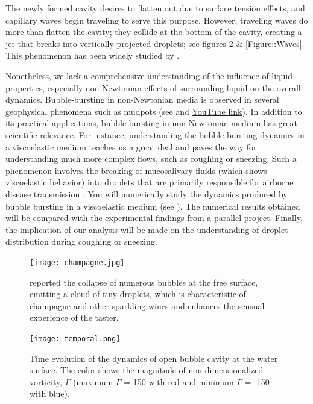 \documentclass[11pt]{article}
\begin{document}
The newly formed cavity desires to flatten out due to surface tension effects, and capillary waves begin traveling to serve this purpose. However, traveling waves do more than flatten the cavity; they collide at the bottom of the cavity, creating a jet that breaks into vertically projected droplets; see figures \ref{Figure::Typical} \& \ref{Figure::Waves}. This phenomenon has been widely studied by \citet{duchemin2002jet, walls2015jet, deike2018dynamics, gordillo2019capillary}.

Nonetheless, we lack a comprehensive understanding of the influence of liquid properties, especially non-Newtonian effects of surrounding liquid on the overall dynamics. Bubble-bursting in non-Newtonian media is observed in several geophysical phenomena such as mudpots (see \citet{sanjay_lohse_jalaal_2021,dixit2024viscoelastic} and \href{https://www.youtube.com/watch?v=a9hUsVq9q7U}{YouTube link}). In addition to its practical applications, bubble-bursting in non-Newtonian medium has great scientific relevance. For instance, understanding the bubble-bursting dynamics in a viscoelastic medium teaches us a great deal and paves the way for understanding much more complex flows, such as coughing or sneezing. Such a phenomenon involves the breaking of mucosalivary fluids (which shows viscoelastic behavior) into droplets that are primarily responsible for airborne disease transmission \citep{walls2017quantifying, bourouiba2021fluid}. You will numerically study the dynamics produced by bubble bursting in a viscoelastic medium (see \citet{dixit2024viscoelastic}). The numerical results obtained will be compared with the experimental findings from a parallel project. Finally, the implication of our analysis will be made on the understanding of droplet distribution during coughing or sneezing. 

\begin{figure}[H]
	\begin{center}
		\texttt{[image: champagne.jpg]}
		\caption{\citet{ghabache2016evaporation} reported the collapse of numerous bubbles at the free surface, emitting a cloud of tiny droplets, which is characteristic of champagne and other sparkling wines and enhances the sensual experience of the taster.}
		\label{fig:champange}
	\end{center}
\end{figure}

\begin{figure}[H]
\begin{center}
 \texttt{[image: temporal.png]}
 \caption{Time evolution of the dynamics of open bubble cavity at the water surface. The color shows the magnitude of non-dimensionalized vorticity, $\Gamma$ (maximum $\Gamma$ = 150 with red and minimum $\Gamma$ = -150 with blue).}
 \label{Figure::Typical}
\end{center}
\end{figure}
\end{document}
